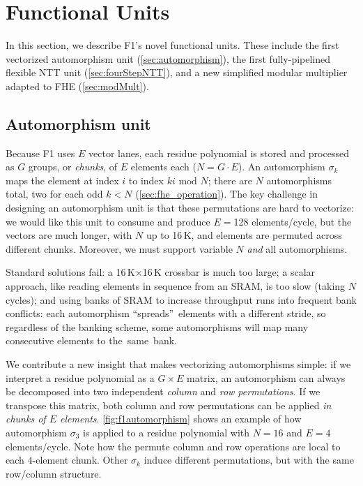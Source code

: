 \section{Functional Units}
\label{sec:FUs}

In this section, we describe F1's novel functional units.
These include the first vectorized automorphism unit (\autoref{sec:automorphism}),
the first fully-pipelined flexible NTT unit (\autoref{sec:fourStepNTT}),
and a new simplified modular multiplier adapted to FHE (\autoref{sec:modMult}).

\subsection{Automorphism unit}\label{sec:automorphism}

\figFOneAutomorphism

Because F1 uses $E$ vector lanes, each residue polynomial
is stored and processed as $G$ groups, or \emph{chunks}, of $E$ elements each ($N=G\cdot E$).
An automorphism $\sigma_k$ maps the element at index $i$ to index $ki \textrm{ mod } N$;
there are $N$ automorphisms total, two for each odd $k < N$ (\autoref{sec:fhe_operation}).
The key challenge in designing an automorphism unit is that these permutations are hard to vectorize:
we would like this unit to consume and produce $E=$128 elements/cycle, but the vectors
are much longer, with $N$ up to 16\,K, and elements are permuted across different chunks.
Moreover, we must support variable $N$ \emph{and} all automorphisms.

Standard solutions fail: a 16\,K$\times$16\,K crossbar is much too large;
a scalar approach, like reading elements in sequence from an SRAM, is too slow (taking $N$ cycles);
and using banks of SRAM to increase throughput runs into frequent bank conflicts:
each automorphism ``spreads''~elements with a different stride, so regardless of the banking scheme,
some automorphisms will map many consecutive elements to the~same~bank.

We contribute a new insight that makes vectorizing automorphisms simple:
if we interpret a residue polynomial as a $G \times E$ matrix,
an automorphism can always be decomposed into two independent \emph{column} and \emph{row permutations}.
If we transpose this matrix, both column and row permutations can 
be applied \emph{in chunks of $E$ elements}. \autoref{fig:f1automorphism} shows an example 
of how automorphism $\sigma_3$ is applied to a residue polynomial
with $N=16$ and $E=4$ elements/cycle.
Note how the permute column and row operations are local to each $4$-element chunk.
Other $\sigma_k$ induce different permutations, but with the same row/column structure.

